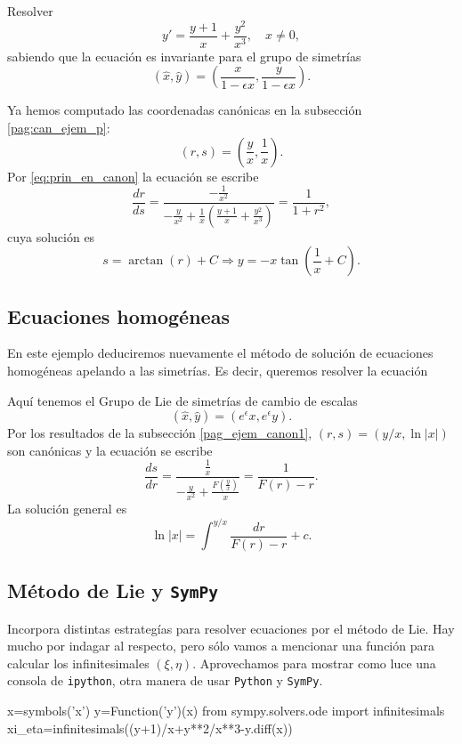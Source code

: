\begin{ejemplo}{} Resolver
\[y'=\frac{y+1}{x}+\frac{y^2}{x^3},\quad x\neq 0,\]
sabiendo que la ecuación es invariante para el grupo de simetrías
\[(\hat{x},\hat{y})=\left(\frac{x}{1-\epsilon x},\frac{y}{1-\epsilon x}   \right).\]
\end{ejemplo}
Ya hemos computado las coordenadas canónicas en la subsección \ref{pag:can_ejem_p}:
\[(r,s)=\left(\frac{y}{x},\frac{1}{x}\right).\]
Por \eqref{eq:prin_en_canon} la ecuación se escribe
\[\frac{dr}{ds}=\frac{-\frac{1}{x^2} }{-\frac{y}{x^2}+\frac{1}{x}\left(
\frac{y+1}{x}+\frac{y^2}{x^3}\right)}=\frac{1}{1+r^2},\]
cuya solución es
\[s=\arctan(r)+C\Rightarrow y=-x\tan\left(\frac{1}{x}+C\right).\]



\subsection{Ecuaciones homogéneas}
\begin{ejemplo}{} En este ejemplo deduciremos nuevamente el método de solución de ecuaciones homogéneas apelando a las simetrías. Es decir, queremos resolver la ecuación
\end{ejemplo}
Aquí tenemos el Grupo de Lie de simetrías de cambio de escalas
\[(\hat{x},\hat{y})=(e^{\epsilon}x,e^{\epsilon}y).\] 
Por los resultados de la subsección \ref{pag_ejem_canon1}, $(r,s)=(y/x,\ln|x|)$ son canónicas y la ecuación se escribe
\[\frac{ds}{dr}=\frac{\frac{1}{x}}{-\frac{y}{x^2}+\frac{F\left(\frac{y}{x}\right)}{x}}=\frac{1}{F(r)-r}.\]
La solución general es 
\[\ln|x|=\int^{y/x}\frac{dr}{F(r)-r}+c.\]




\subsection{Método de Lie y \texttt{SymPy}}
 Incorpora distintas estrategías para resolver ecuaciones por el método de Lie. Hay mucho por indagar al respecto, pero sólo vamos a mencionar una función para calcular los infinitesimales $(\xi,\eta)$.  Aprovechamos para mostrar como luce una consola de \texttt{ipython}, otra manera de usar \texttt{Python} y \texttt{SymPy}.

\begin{sympyblock}[][frame=single]
x=symbols('x')
y=Function('y')(x)
from sympy.solvers.ode import infinitesimals
xi_eta=infinitesimals((y+1)/x+y**2/x**3-y.diff(x))
 
\end{sympyblock}

